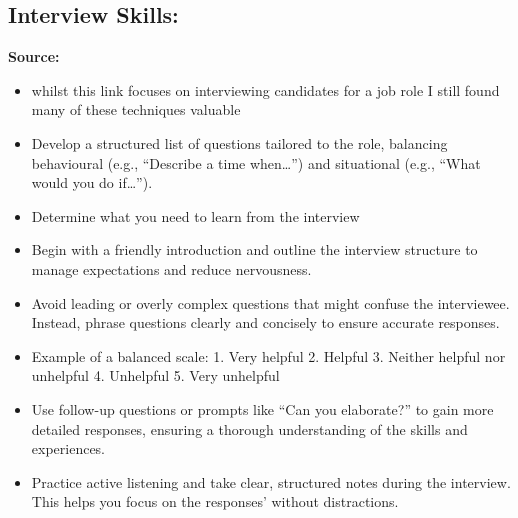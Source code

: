 \subsection*{Interview Skills:}
\textbf{Source:} \cite{HowInterviewSomeone}
\begin{itemize}
	\item whilst this link focuses on interviewing candidates for a job role I still found many of these techniques valuable

	\item Develop a structured list of questions tailored to the role, balancing behavioural (e.g., “Describe a time when…”) and situational (e.g., “What would you do if…”).
	\item  Determine what you need to learn from the interview

	\item  Begin with a friendly introduction and outline the interview structure to manage expectations and reduce nervousness.

	\item Avoid leading or overly complex questions that might confuse the interviewee. Instead, phrase questions clearly and concisely to ensure accurate responses.
	\item Example of a balanced scale:
	1.	Very helpful
	2.	Helpful
	3.	Neither helpful nor unhelpful
	4.	Unhelpful
	5.	Very unhelpful

	\item Use follow-up questions or prompts like “Can you elaborate?” to gain more detailed responses, ensuring a thorough understanding of the skills and experiences.

	\item Practice active listening and take clear, structured notes during the interview. This helps you focus on the responses' without distractions.
\end{itemize}
